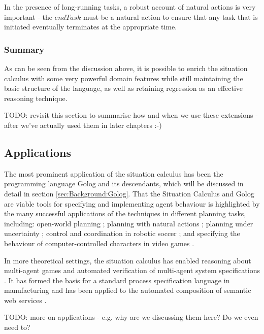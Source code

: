 In the presence of long-running tasks, a robust account of natural
actions is very important - the $endTask$ must be a natural action
to ensure that any task that is initiated eventually terminates at
the appropriate time.


\subsubsection{Summary}

As can be seen from the discussion above, it is possible to enrich
the situation calculus with some very powerful domain features while
still maintaining the basic structure of the language, as well as
retaining regression as an effective reasoning technique.

TODO: revisit this section to summarise how and when we use these
extensions - after we've actually used them in later chapters :-)


\subsection{Applications}

The most prominent application of the situation calculus has been
the programming language Golog \citep{levesque97golog} and its descendants,
which will be discussed in detail in section \ref{sec:Background:Golog}.
That the Situation Calculus and Golog are viable tools for specifying
and implementing agent behaviour is highlighted by the many successful
applications of the techniques in different planning tasks, including:
open-world planning \citep{Finzi00open_world_sitcalc}; planning with
natural actions \citep{pirri00planning_nat_acts}; planning under
uncertainty \citep{baier03golog_planning}; control and coordination
in robotic soccer \citep{Ferrein2005readylog}; and specifying the
behaviour of computer-controlled characters in video games \citep{jacobs05unrealgolog}.

In more theoretical settings, the situation calculus has enabled reasoning
about multi-agent games \citep{delgrande01sitcalc_cleudo} and automated
verification of multi-agent system specifications \citep{shapiro02casl,lesperance05ecasl}.
It has formed the basis for a standard process specification language
in manufacturing \citep{gruninger04psl} and has been applied to the
automated composition of semantic web services \citep{mcilraith02golog_web_services}.

TODO: more on applications - e.g. why are we discussing them here?
Do we even need to?


